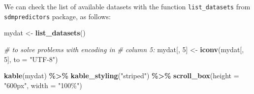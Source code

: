 \documentclass[
]{book}
\newenvironment{Shaded}{\begin{snugshade}}{\end{snugshade}}
\newcommand{\AttributeTok}[1]{\textcolor[rgb]{0.13,0.29,0.53}{#1}}
\newcommand{\CommentTok}[1]{\textcolor[rgb]{0.56,0.35,0.01}{\textit{#1}}}
\newcommand{\DecValTok}[1]{\textcolor[rgb]{0.00,0.00,0.81}{#1}}
\newcommand{\FunctionTok}[1]{\textcolor[rgb]{0.13,0.29,0.53}{\textbf{#1}}}
\newcommand{\NormalTok}[1]{#1}
\newcommand{\OtherTok}[1]{\textcolor[rgb]{0.56,0.35,0.01}{#1}}
\newcommand{\SpecialCharTok}[1]{\textcolor[rgb]{0.81,0.36,0.00}{\textbf{#1}}}
\newcommand{\StringTok}[1]{\textcolor[rgb]{0.31,0.60,0.02}{#1}}
\begin{document}
We can check the list of available datasets with the function \texttt{list\_datasets} from \texttt{sdmpredictors} package, as follows:

\begin{Shaded}
\begin{Highlighting}[]
\NormalTok{mydat }\OtherTok{\textless{}{-}} \FunctionTok{list\_datasets}\NormalTok{()}

\CommentTok{\# to solve problems with encoding in}
\CommentTok{\# column 5:}
\NormalTok{mydat[, }\DecValTok{5}\NormalTok{] }\OtherTok{\textless{}{-}} \FunctionTok{iconv}\NormalTok{(mydat[, }\DecValTok{5}\NormalTok{], }\AttributeTok{to =} \StringTok{"UTF{-}8"}\NormalTok{)}

\FunctionTok{kable}\NormalTok{(mydat) }\SpecialCharTok{\%\textgreater{}\%}
    \FunctionTok{kable\_styling}\NormalTok{(}\StringTok{"striped"}\NormalTok{) }\SpecialCharTok{\%\textgreater{}\%}
    \FunctionTok{scroll\_box}\NormalTok{(}\AttributeTok{height =} \StringTok{"600px"}\NormalTok{, }\AttributeTok{width =} \StringTok{"100\%"}\NormalTok{)}
\end{Highlighting}
\end{Shaded}
\end{document}
